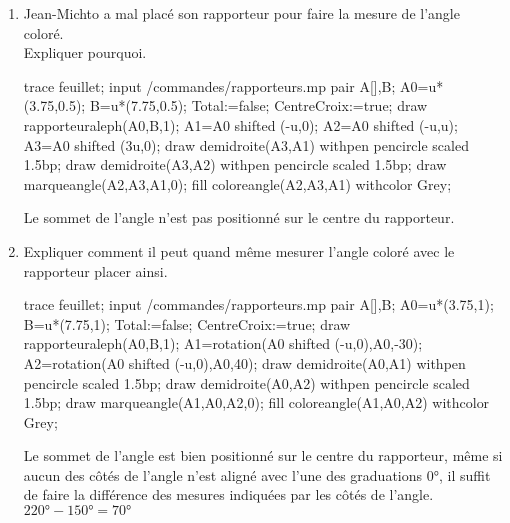 \begin{corrige}
   \begin{enumerate}
      \item Jean-Michto a mal placé son rapporteur pour faire la mesure de l'angle coloré.\\\smallskip
      Expliquer pourquoi.\\
      \begin{Geometrie}[CoinBG={(0,-3.5u)},CoinHD={(7.5u,4u)}]
          trace feuillet;
          input \persopath/commandes/rapporteurs.mp
          pair A[],B;
          A0=u*(3.75,0.5);
          B=u*(7.75,0.5);
          Total:=false;%
          CentreCroix:=true;%
          draw rapporteuraleph(A0,B,1);        
          A1=A0 shifted (-u,0); 
          A2=A0 shifted (-u,u);
          A3=A0 shifted (3u,0);
          draw demidroite(A3,A1) withpen pencircle scaled 1.5bp;
          draw demidroite(A3,A2) withpen pencircle scaled 1.5bp;
          draw marqueangle(A2,A3,A1,0);
          fill coloreangle(A2,A3,A1) withcolor Grey;
      \end{Geometrie}
      
      {\red Le sommet de l'angle n'est pas positionné sur le centre du rapporteur.}
      \item Expliquer comment il peut quand même mesurer l'angle coloré avec le rapporteur placer ainsi.\\\smallskip
      \begin{Geometrie}[CoinBG={(0,-3u)},CoinHD={(7.5u,4.5u)}]
          trace feuillet;
          input \persopath/commandes/rapporteurs.mp
          pair A[],B;
          A0=u*(3.75,1);
          B=u*(7.75,1);
          Total:=false;%
          CentreCroix:=true;%
          draw rapporteuraleph(A0,B,1);
          A1=rotation(A0 shifted (-u,0),A0,-30); 
          A2=rotation(A0 shifted (-u,0),A0,40);           
          draw demidroite(A0,A1) withpen pencircle scaled 1.5bp;
          draw demidroite(A0,A2) withpen pencircle scaled 1.5bp;
          draw marqueangle(A1,A0,A2,0);
          fill coloreangle(A1,A0,A2) withcolor Grey;
      \end{Geometrie}

      {\red Le sommet de l'angle est bien positionné sur le centre du rapporteur, même si aucun des côtés de l'angle n'est aligné avec
      l'une des graduations \ang{0}, il suffit de faire la différence des mesures indiquées par les côtés de l'angle.\\
      $\ang{220}-\ang{150}=\ang{70}$
      }
  \end{enumerate}
\end{corrige}
   